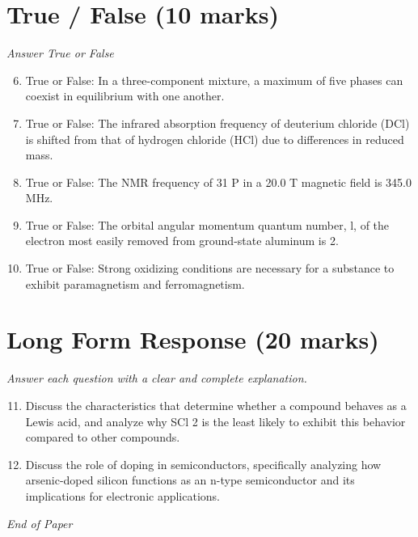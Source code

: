 \documentclass[12pt]{article}
\begin{document}
\section*{True / False (10 marks)}
\textit{Answer True or False}
\begin{enumerate}[label=\arabic*.]
\setcounter{enumi}{5}
\item True or False: In a three-component mixture, a maximum of five phases can coexist in equilibrium with one another.
\item True or False: The infrared absorption frequency of deuterium chloride (DCl) is shifted from that of hydrogen chloride (HCl) due to differences in reduced mass.
\item True or False: The NMR frequency of 31 P in a 20.0 T magnetic field is 345.0 MHz.
\item True or False: The orbital angular momentum quantum number, l, of the electron most easily removed from ground-state aluminum is 2.
\item True or False: Strong oxidizing conditions are necessary for a substance to exhibit paramagnetism and ferromagnetism.
\end{enumerate}

\section*{Long Form Response (20 marks)}
\textit{Answer each question with a clear and complete explanation.}
\begin{enumerate}[label=\arabic*.]
\setcounter{enumi}{10}
\item Discuss the characteristics that determine whether a compound behaves as a Lewis acid, and analyze why SCl 2 is the least likely to exhibit this behavior compared to other compounds.
\item Discuss the role of doping in semiconductors, specifically analyzing how arsenic-doped silicon functions as an n-type semiconductor and its implications for electronic applications.
\end{enumerate}

\vfill
\noindent\textit{End of Paper}
\end{document}
